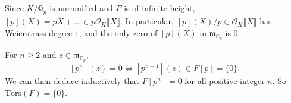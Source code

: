 \documentclass{article}
\theoremstyle{definition}
\theoremstyle{remark}
\newcommand{\C}{\mathbb{C}}
\newcommand{\Q}{\mathbb{Q}}
\renewcommand{\O}{\mathcal{O}}
\newcommand{\m}{\mathfrak{m}}
\begin{document}
\subsection{}
Since $K/\Q_p$ is unramified and $F$ is of infinite height, $[p](X) = pX +\dots\in p\O_K\llbracket X\rrbracket$.
In particular, $[p](X)/p\in \O_K\llbracket X\rrbracket$ has Weierstrass degree $1$, and the only zero of $[p](X)$ in $\m_{\C_p}$ is $0$.

For $n\ge 2$ and $z\in\m_{\C_p}$, \[[p^n](z) = 0\iff [p^{n-1}](z)\in F[p] = \{0\}.\]
We can then deduce inductively that $F[p^n] = 0$ for all positive integer $n$.
So $\mathrm{Tors}(F) = \{0\}$.
\end{document}

